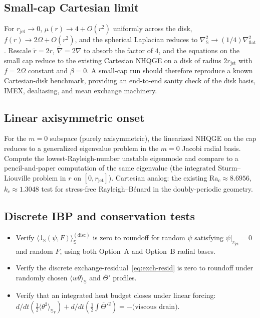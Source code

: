 \documentclass[11pt]{article}
\newcommand{\Lapproj}{\nabla^2_{\!\mathrm{flat}}}
\newcommand{\Lapsphere}{\nabla^2_{\!\mathbb{S}}}
\newcommand{\Jsphere}{\mathsf{J}_{\mathbb{S}}}
\newcommand{\meanS}[1]{\langle #1 \rangle_{\mathbb{S}}}
\newcommand{\Ra}{\mathrm{Ra}}
\newcommand{\rjet}{r_{\mathrm{jet}}}
\begin{document}
\subsection{Small-cap Cartesian limit}

For $\rjet \to 0$, $\mu(r) \to 4 + O(r^{2})$ uniformly across the
disk, $f(r) \to 2\Omega + O(r^{2})$, and the spherical Laplacian
reduces to $\Lapsphere \to (1/4)\Lapproj$.  Rescale
$\widetilde{r} = 2 r$, $\widetilde{\nabla} = 2\nabla$ to absorb the
factor of $4$, and the equations on the small cap reduce to the
existing Cartesian NHQGE on a disk of radius $2\rjet$ with $f =
2\Omega$ constant and $\beta = 0$.  A small-cap run should therefore
reproduce a known Cartesian-disk benchmark, providing an end-to-end
sanity check of the disk basis, IMEX, dealiasing, and mean exchange
machinery.

\subsection{Linear axisymmetric onset}

For the $m = 0$ subspace (purely axisymmetric), the linearized NHQGE
on the cap reduces to a generalized eigenvalue problem in the $m=0$
Jacobi radial basis.  Compute the lowest-Rayleigh-number unstable
eigenmode and compare to a pencil-and-paper computation of the same
eigenvalue (the integrated Sturm--Liouville problem in $r$ on
$[0, \rjet]$).  Cartesian analog: the existing $\Ra_{c} \approx
8.6956$, $k_{c} \approx 1.3048$ test for stress-free Rayleigh--B\'enard
in the doubly-periodic geometry.

\subsection{Discrete IBP and conservation tests}

\begin{itemize}[leftmargin=1.5em]
  \item Verify $\meanS{\Jsphere(\psi, F)}^{(\mathrm{disc})}$ is zero
  to roundoff for random $\psi$ satisfying $\psi|_{\rjet} = 0$ and
  random $F$, using both Option~A and Option~B radial bases.
  \item Verify the discrete exchange-residual~\eqref{eq:exch-resid}
  is zero to roundoff under randomly chosen $\meanS{w\theta}$ and
  $\overline{\Theta}'$ profiles.
  \item Verify that an integrated heat budget closes under linear
  forcing: $d/dt(\tfrac{1}{2}\meanS{\theta^{2}}_{V}) +
  d/dt(\tfrac{1}{2}\int \overline{\Theta}'^{2}) = -\text{(viscous
  drain)}$.
\end{itemize}
\end{document}
